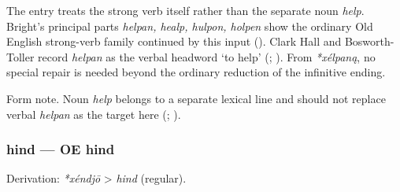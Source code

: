 \documentclass[
  british,
  a4paper,
]{article}
\begin{document}
The entry treats the strong verb itself rather than the separate noun
\emph{help}. Bright's principal parts \emph{helpan, healp, hulpon,
holpen} show the ordinary Old English strong-verb family continued by
this input ().
Clark Hall and Bosworth-Toller record \emph{helpan} as the verbal
headword `to help' (;
). From
\emph{*xélpaną}, no special repair is needed beyond the ordinary
reduction of the infinitive ending.

Form note. Noun \emph{help} belongs to a separate lexical line and
should not replace verbal \emph{helpan} as the target here
(;
).

\subsubsection{hind --- OE hind}\label{hind-oe-hind}

Derivation: \emph{*xéndjō} \textgreater{} \emph{hind} (regular).

\begingroup
\setlength{\fboxsep}{6pt}
\end{document}
